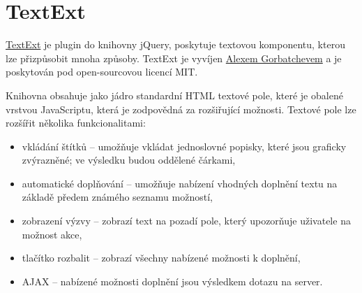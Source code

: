 \section{TextExt}

\href{http://textextjs.com/}{TextExt} je plugin do knihovny jQuery, poskytuje textovou komponentu, kterou lze přizpůsobit mnoha způsoby.
TextExt je vyvíjen \href{mailto:alex.gorbatchev@gmail.com}{Alexem Gorbatchevem} a je poskytován pod open-sourcovou licencí MIT.

Knihovna obsahuje jako jádro standardní HTML textové pole, které je obalené vrstvou JavaScriptu, která je zodpovědná za rozšiřující možnosti.
Textové pole lze rozšířit několika funkcionalitami:
\begin{itemize}
	\item vkládání štítků -- umožňuje vkládat jednoslovné popisky, které jsou graficky zvýrazněné; ve výsledku budou oddělené čárkami,
	\item automatické doplňování -- umožňuje nabízení vhodných doplnění textu na základě předem známého seznamu možností,
	\item zobrazení výzvy -- zobrazí text na pozadí pole, který upozorňuje uživatele na možnost akce,
	\item tlačítko rozbalit -- zobrazí všechny nabízené možnosti k doplnění,
	\item AJAX -- nabízené možnosti doplnění jsou výsledkem dotazu na server.
\end{itemize}

